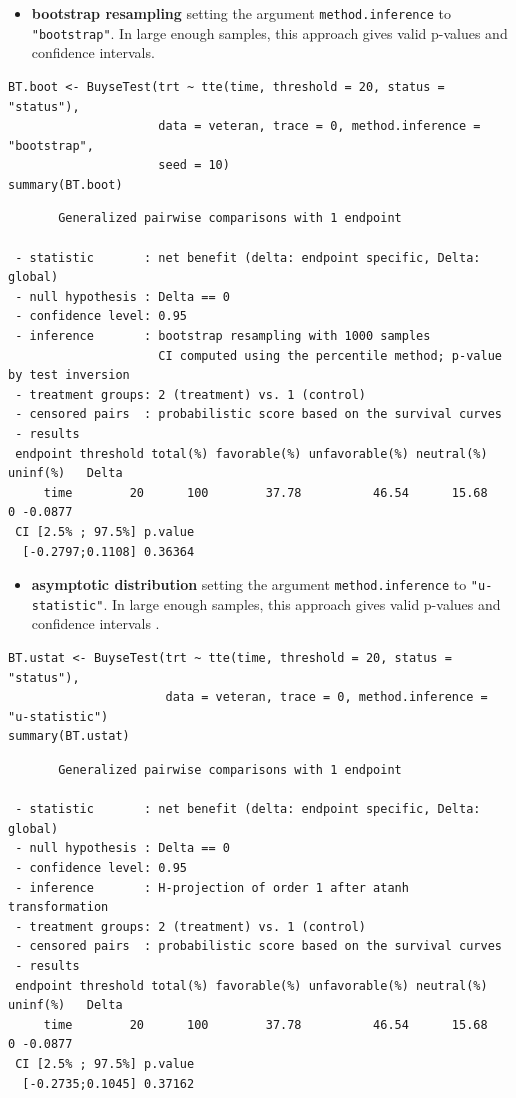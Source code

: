 \documentclass[12pt]{article}
\begin{document}
\begin{itemize}
\item \textbf{bootstrap resampling} setting the argument \texttt{method.inference} to
\texttt{"bootstrap"}. In large enough samples, this approach gives valid
p-values and confidence intervals.
\end{itemize}

\lstset{language=r,label= ,caption= ,captionpos=b,numbers=none}
\begin{lstlisting}
BT.boot <- BuyseTest(trt ~ tte(time, threshold = 20, status = "status"),
                     data = veteran, trace = 0, method.inference = "bootstrap",
                     seed = 10) 
summary(BT.boot)
\end{lstlisting}

\begin{verbatim}
       Generalized pairwise comparisons with 1 endpoint

 - statistic       : net benefit (delta: endpoint specific, Delta: global) 
 - null hypothesis : Delta == 0 
 - confidence level: 0.95 
 - inference       : bootstrap resampling with 1000 samples 
                     CI computed using the percentile method; p-value by test inversion 
 - treatment groups: 2 (treatment) vs. 1 (control) 
 - censored pairs  : probabilistic score based on the survival curves
 - results
 endpoint threshold total(%) favorable(%) unfavorable(%) neutral(%) uninf(%)   Delta
     time        20      100        37.78          46.54      15.68        0 -0.0877
 CI [2.5% ; 97.5%] p.value 
  [-0.2797;0.1108] 0.36364
\end{verbatim}

\begin{itemize}
\item \textbf{asymptotic distribution} setting the argument \texttt{method.inference} to
\texttt{"u-statistic"}. In large enough samples, this approach gives valid
p-values and confidence intervals \citep{ozenne2021asymptotic}.
\end{itemize}

\lstset{language=r,label= ,caption= ,captionpos=b,numbers=none}
\begin{lstlisting}
BT.ustat <- BuyseTest(trt ~ tte(time, threshold = 20, status = "status"),
                      data = veteran, trace = 0, method.inference = "u-statistic") 
summary(BT.ustat)
\end{lstlisting}

\begin{verbatim}
       Generalized pairwise comparisons with 1 endpoint

 - statistic       : net benefit (delta: endpoint specific, Delta: global) 
 - null hypothesis : Delta == 0 
 - confidence level: 0.95 
 - inference       : H-projection of order 1 after atanh transformation 
 - treatment groups: 2 (treatment) vs. 1 (control) 
 - censored pairs  : probabilistic score based on the survival curves
 - results
 endpoint threshold total(%) favorable(%) unfavorable(%) neutral(%) uninf(%)   Delta
     time        20      100        37.78          46.54      15.68        0 -0.0877
 CI [2.5% ; 97.5%] p.value 
  [-0.2735;0.1045] 0.37162
\end{verbatim}
\end{document}
